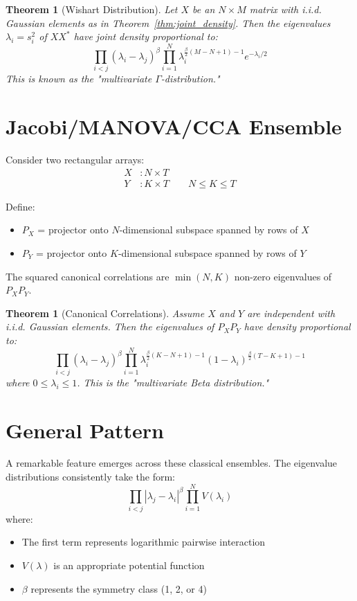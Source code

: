 \documentclass[letterpaper,11pt,oneside,reqno]{article}
\numberwithin{equation}{section}
\newtheorem{theorem}[proposition]{Theorem}
\theoremstyle{definition}
\begin{document}
\begin{theorem}[Wishart Distribution]
Let $X$ be an $N\times M$ matrix with i.i.d. Gaussian elements as in Theorem~\ref{thm:joint_density}. Then the eigenvalues $\lambda_i = s_i^2$ of $XX^*$ have joint density proportional to:
\[ \prod_{i<j} (\lambda_i-\lambda_j)^\beta \prod_{i=1}^N \lambda_i^{\frac{\beta}{2}(M-N+1)-1} e^{-\lambda_i/2} \]
This is known as the "multivariate $\Gamma$-distribution."
\end{theorem}

\section{Jacobi/MANOVA/CCA Ensemble}

Consider two rectangular arrays:
\begin{align*}
X &: N\times T \\
Y &: K\times T \qquad N\leq K\leq T
\end{align*}

Define:
\begin{itemize}
\item $P_X$ = projector onto $N$-dimensional subspace spanned by rows of $X$
\item $P_Y$ = projector onto $K$-dimensional subspace spanned by rows of $Y$
\end{itemize}

The squared canonical correlations are $\min(N,K)$ non-zero eigenvalues of $P_XP_Y$.

\begin{theorem}[Canonical Correlations]
Assume $X$ and $Y$ are independent with i.i.d. Gaussian elements. Then the eigenvalues of $P_XP_Y$ have density proportional to:
\[ \prod_{i<j} (\lambda_i-\lambda_j)^\beta \prod_{i=1}^N \lambda_i^{\frac{\beta}{2}(K-N+1)-1} (1-\lambda_i)^{\frac{\beta}{2}(T-K+1)-1} \]
where $0\leq \lambda_i\leq 1$. This is the "multivariate Beta distribution."
\end{theorem}

\section{General Pattern}

A remarkable feature emerges across these classical ensembles. The eigenvalue distributions consistently take the form:
\[ \prod_{i<j} |\lambda_j-\lambda_i|^\beta \prod_{i=1}^N V(\lambda_i) \]
where:
\begin{itemize}
\item The first term represents logarithmic pairwise interaction
\item $V(\lambda)$ is an appropriate potential function
\item $\beta$ represents the symmetry class (1, 2, or 4)
\end{itemize}
\end{document}
